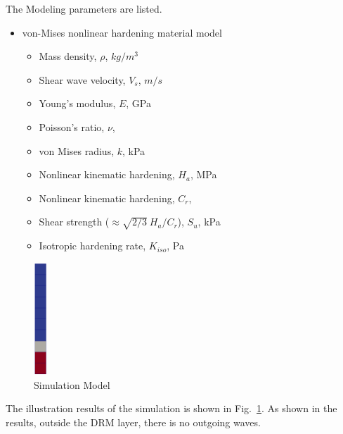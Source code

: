 The Modeling parameters are listed.
\begin{itemize}
  \item von-Mises nonlinear hardening material model 
  \begin{itemize}
    \item Mass density, $\rho$, \enspace {} $kg/m^3$
    \item Shear wave velocity, $V_s$, \enspace {} $m/s$
    \item Young's modulus, $E$, \enspace {} GPa
    \item Poisson's ratio, $\nu$, \enspace {}
    \item von Mises radius, $k$, \enspace {} kPa
    \item Nonlinear kinematic hardening, $H_a$, \enspace {} MPa
    \item Nonlinear kinematic hardening, $C_r$, \enspace {}
    \item Shear strength ($\approx \sqrt{2/3}\ {H_a/C_r} $), $S_u$, \enspace {} kPa
    \item Isotropic hardening rate, $K_{iso}$, \enspace {} Pa
  \end{itemize}
\end{itemize}





\begin{figure}[H]
  \centering
  \includegraphics[width = 0.5cm]{./Figure-files/nonlinear_analysis_steps/free_field_1D/overview.png}
  \caption{Simulation Model}
  \label{fig_decon_1D_motion_1D_model}
\end{figure}

The illustration results of the simulation is shown in Fig.~\ref{fig_decon_1D_motion_1D_model}.
As shown in the results, outside the DRM layer, there is no outgoing waves. 

